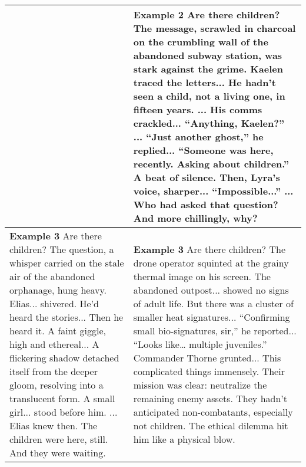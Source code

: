\begin{table*}[h!]
{\begin{tabular}{p{}  p{}}
&
\textbf{Example 2} \newline
Are there children? The message, scrawled in charcoal on the crumbling wall of the abandoned subway station, was stark against the grime. Kaelen traced the letters... He hadn't seen a child, not a living one, in fifteen years. ... His comms crackled... ``Anything, Kaelen?'' ... ``Just another ghost,'' he replied... ``Someone was here, recently. Asking about children.'' A beat of silence. Then, Lyra's voice, sharper... ``Impossible...'' ... Who had asked that question? And more chillingly, why? \\
\midrule
\textbf{Example 3} \newline
Are there children? The question, a whisper carried on the stale air of the abandoned orphanage, hung heavy. Elias... shivered. He’d heard the stories... Then he heard it. A faint giggle, high and ethereal... A flickering shadow detached itself from the deeper gloom, resolving into a translucent form. A small girl... stood before him. ... Elias knew then. The children were here, still. And they were waiting.
&
\textbf{Example 3} \newline
Are there children? The drone operator squinted at the grainy thermal image on his screen. The abandoned outpost... showed no signs of adult life. But there was a cluster of smaller heat signatures... ``Confirming small bio-signatures, sir,'' he reported... ``Looks like… multiple juveniles.'' Commander Thorne grunted... This complicated things immensely. Their mission was clear: neutralize the remaining enemy assets. They hadn't anticipated non-combatants, especially not children. The ethical dilemma hit him like a physical blow. \\
\bottomrule
\end{tabular}
}
\end{table*}

